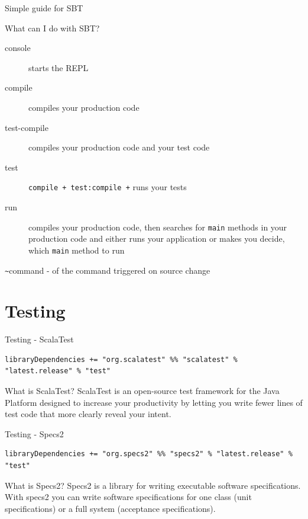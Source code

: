 \begin{frame}[fragile]{Simple guide for SBT}
\begin{block}{What can I do with SBT?}
\begin{description}
\item[console] starts the REPL
\item[compile] compiles your production code
\item[test-compile] compiles your production code and your test code
\item[test] \lstinline!compile + test:compile +! runs your tests
\item[run] compiles your production code, then searches for \lstinline!main!
methods in your production code and either runs your application or makes you
decide, which \lstinline!main! method to run
\end{description}
\end{block}
\pause
\begin{center}
\lstinline!~!command -  of the command
triggered on source change
\end{center}
\end{frame}

\section{Testing}
\begin{frame}[fragile]{Testing - ScalaTest}
\begin{center}
\end{center}
\begin{lstlisting}[basicstyle=\scriptsize]
libraryDependencies += "org.scalatest" %% "scalatest" % "latest.release" % "test"
\end{lstlisting}
\begin{block}{What is ScalaTest?}
ScalaTest is an open-source test framework for the Java Platform designed to
increase your productivity by letting you write fewer lines of test code that
more clearly reveal your intent.
\end{block}
\end{frame}
\begin{frame}[fragile]{Testing - Specs2}
\begin{center}
\end{center}
\begin{lstlisting}[basicstyle=\scriptsize]
libraryDependencies += "org.specs2" %% "specs2" % "latest.release" % "test"
\end{lstlisting}
\begin{block}{What is Specs2?}
Specs2 is a library for writing executable software specifications. With specs2
you can write software specifications for one class (unit specifications) or a
full system (acceptance specifications).
\end{block}
\end{frame}

